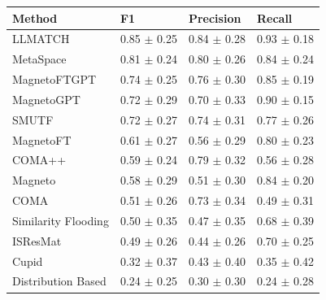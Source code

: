 \begin{tabular}{llll}
\toprule
Method & F1 & Precision & Recall \\
\midrule
LLMATCH & 0.85 $\pm$ 0.25 & 0.84 $\pm$ 0.28 & 0.93 $\pm$ 0.18 \\
MetaSpace & 0.81 $\pm$ 0.24 & 0.80 $\pm$ 0.26 & 0.84 $\pm$ 0.24 \\
MagnetoFTGPT & 0.74 $\pm$ 0.25 & 0.76 $\pm$ 0.30 & 0.85 $\pm$ 0.19 \\
MagnetoGPT & 0.72 $\pm$ 0.29 & 0.70 $\pm$ 0.33 & 0.90 $\pm$ 0.15 \\
SMUTF & 0.72 $\pm$ 0.27 & 0.74 $\pm$ 0.31 & 0.77 $\pm$ 0.26 \\
MagnetoFT & 0.61 $\pm$ 0.27 & 0.56 $\pm$ 0.29 & 0.80 $\pm$ 0.23 \\
COMA++ & 0.59 $\pm$ 0.24 & 0.79 $\pm$ 0.32 & 0.56 $\pm$ 0.28 \\
Magneto & 0.58 $\pm$ 0.29 & 0.51 $\pm$ 0.30 & 0.84 $\pm$ 0.20 \\
COMA & 0.51 $\pm$ 0.26 & 0.73 $\pm$ 0.34 & 0.49 $\pm$ 0.31 \\
Similarity Flooding & 0.50 $\pm$ 0.35 & 0.47 $\pm$ 0.35 & 0.68 $\pm$ 0.39 \\
ISResMat & 0.49 $\pm$ 0.26 & 0.44 $\pm$ 0.26 & 0.70 $\pm$ 0.25 \\
Cupid & 0.32 $\pm$ 0.37 & 0.43 $\pm$ 0.40 & 0.35 $\pm$ 0.42 \\
Distribution Based & 0.24 $\pm$ 0.25 & 0.30 $\pm$ 0.30 & 0.24 $\pm$ 0.28 \\
\bottomrule
\end{tabular}
